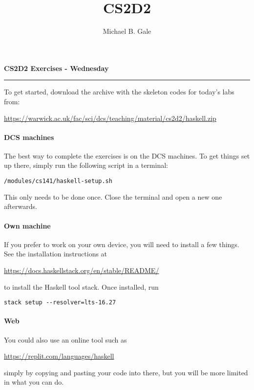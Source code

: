 \documentclass[]{uow-exercises}
\author{Michael B. Gale}
\title{CS2D2}
\begin{document}
\pagestyle{fancy}
\thispagestyle{fancy}

\begin{center}
    \textbf{\LARGE CS2D2 Exercises - Wednesday}
\end{center} \hrule \vspace{0.5cm}

To get started, download the archive with the skeleton codes for today's labs from:
\begin{center}\small
    \url{https://warwick.ac.uk/fac/sci/dcs/teaching/material/cs2d2/haskell.zip}
\end{center}

\paragraph{DCS machines} The best way to complete the exercises is on the DCS machines. To get things set up there, simply run the following script in a terminal:
\begin{verbatim}
/modules/cs141/haskell-setup.sh
\end{verbatim}
This only needs to be done once. Close the terminal and open a new one afterwards.

\paragraph{Own machine} If you prefer to work on your own device, you will need to install a few things. See the installation instructions at
\begin{center}
    \url{https://docs.haskellstack.org/en/stable/README/}
\end{center}
to install the Haskell tool stack. Once installed, run
\begin{verbatim}
stack setup --resolver=lts-16.27
\end{verbatim}

\paragraph{Web} You could also use an online tool such as
\begin{center}
    \url{https://replit.com/languages/haskell}
\end{center}
simply by copying and pasting your code into there, but you will be more limited in what you can do.



	
\end{document}
